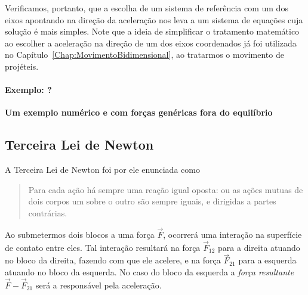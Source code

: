 Verificamos, portanto, que a escolha de um sistema de referência com um dos eixos apontando na direção da aceleração nos leva a um sistema de equações cuja solução é mais simples. Note que a ideia de simplificar o tratamento matemático ao escolher a aceleração na direção de um dos eixos coordenados já foi utilizada no Capítulo~\ref{Chap:MovimentoBidimensional}, ao tratarmos o movimento de projéteis.

\paragraph{Exemplo: ?}

\textbf{Um exemplo numérico e com forças genéricas fora do equilíbrio}



\subsection{Terceira Lei de Newton}

A Terceira Lei de Newton foi por ele enunciada como
\begin{quote}
    Para cada ação há sempre uma reação igual oposta: ou as ações mutuas de dois corpos um sobre o outro são sempre iguais, e dirigidas a partes contrárias.
\end{quote}

\begin{marginfigure}
\centering
{}
\caption{Ao submetermos dois blocos a uma força $\vec{F}$, ocorrerá uma interação na superfície de contato entre eles. Tal interação resultará na força $\vec{F}_{12}$ para a direita atuando no bloco da direita, fazendo com que ele acelere, e na força $\vec{F}_{21}$ para a esquerda atuando no bloco da esquerda. No caso do bloco da esquerda a \emph{força resultante} $\vec{F} - \vec{F}_{21}$ será a responsável pela aceleração.}
\end{marginfigure}

